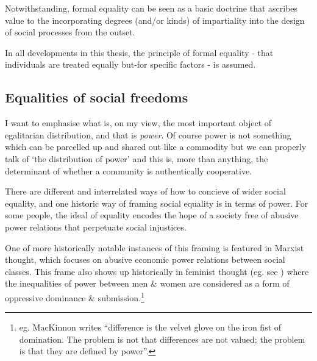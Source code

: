 Notwithstanding, formal equality can be seen as a basic doctrine that ascribes value to the incorporating degrees (and/or kinds) of impartiality into the design of social processes from the outset.%

In all developments in this thesis, the principle of formal equality - that individuals are treated equally but-for specific factors - is assumed.

\subsection{Equalities of social freedoms}

\begin{displayquote}
I want to emphasise what is, on my view, the most important object of egalitarian distribution, and that is \textit{power}. Of course power is not something which can be parcelled up and shared out like a commodity but we can properly talk of `the distribution of power' and this is, more than anything, the determinant of whether a community is authentically cooperative.\cite{TheSocialBasisofEquality:1998}
\end{displayquote}

There are different and interrelated ways of how to concieve of wider social equality, and one historic way of framing social equality is in terms of power.
For some people, the ideal of equality encodes the hope of a society free of abusive power relations that perpetuate social injustices.

One of more historically notable instances of this framing is featured in Marxist thought, which focuses on abusive economic power relations between social classes. This frame also shows up historically in feminist thought (eg. see \cite{Cudd2006-CUDAO}) where the inequalities of power between men \& women are considered as a form of oppressive dominance \& submission.\footnote{eg. MacKinnon writes ``difference is the velvet glove on the iron fist of domination. The problem is not that differences are not valued; the problem is that they are defined by power''\cite{mackinnon1989toward}.}

